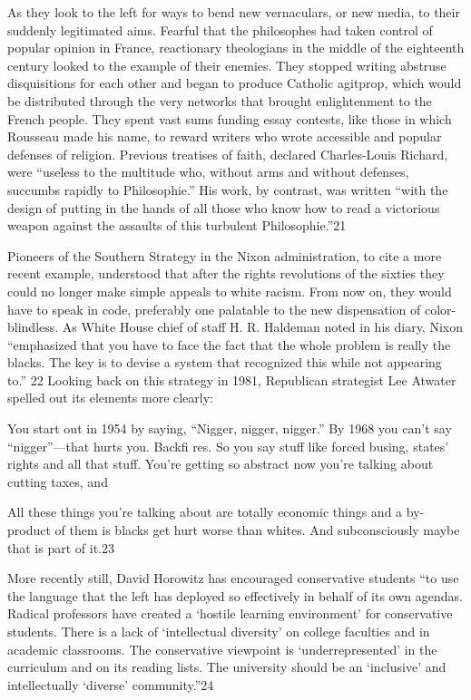  \par 
As they look to the left for ways to bend new vernaculars, or new media, to their suddenly legitimated aims. Fearful that the philosophes had taken control of popular opinion in France, reactionary theologians in the middle of the eighteenth century looked to the example of their enemies. They stopped writing abstruse disquisitions for each other and began to produce Catholic agitprop, which would be distributed through the very networks that brought enlightenment to the French people. They spent vast sums funding essay contests, like those in which Rousseau made his name, to reward writers who wrote accessible and popular defenses of religion. Previous treatises of faith, declared Charles-Louis Richard, were “useless to the multitude who, without arms and without defenses, succumbs rapidly to Philosophie.” His work, by contrast, was written “with the design of putting in the hands of all those who know how to read a victorious weapon against the assaults of this turbulent Philosophie.”{\color{blue}21}
 \par 
Pioneers of the Southern Strategy in the Nixon administration, to cite a more recent example, understood that after the rights revolutions of the sixties they could no longer make simple appeals to white racism. From now on, they would have to speak in code, preferably one palatable to the new dispensation of color-blindless. As White House chief of staff H. R. Haldeman noted in his diary, Nixon “emphasized that you have to face the fact that the whole problem is really the blacks. The key is to devise a system that recognized this while not appearing to.” {\color{blue}22} Looking back on this strategy in 1981, Republican strategist Lee Atwater spelled out its elements more clearly:
 \par 
You start out in 1954 by saying, “Nigger, nigger, nigger.” By 1968 you can’t say “nigger”—that hurts you. Backfi res. So you say stuff like forced busing, states’ rights and all that stuff. You’re getting so abstract now you’re talking about cutting taxes, and
 \par 
All these things you’re talking about are totally economic things and a by-product of them is blacks get hurt worse than whites. And subconsciously maybe that is part of it.{\color{blue}23}
 \par 
More recently still, David Horowitz has encouraged conservative students “to use the language that the left has deployed so effectively in behalf of its own agendas. Radical professors have created a ‘hostile learning environment’ for conservative students. There is a lack of ‘intellectual diversity’ on college faculties and in academic classrooms. The conservative viewpoint is ‘underrepresented’ in the curriculum and on its reading lists. The university should be an ‘inclusive’ and intellectually ‘diverse’ community.”{\color{blue}24}

